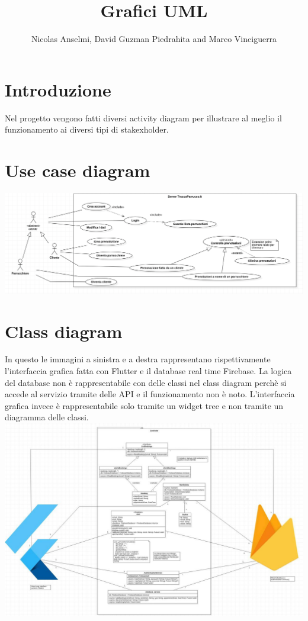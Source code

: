 \documentclass{article}
\title{Grafici UML}
\author{Nicolas Anselmi, David Guzman Piedrahita and Marco Vinciguerra}
\begin{document}
\maketitle        
\section{Introduzione}
Nel progetto vengono fatti diversi activity diagram per illustrare al
meglio il funzionamento ai diversi tipi di stakexholder.
 
\section{Use case diagram}
\includegraphics[scale = 0.45]{ImmaginiUML/UseCase.png}
\newpage
\section{Class diagram}
In questo le immagini a sinistra e a destra rappresentano rispettivamente l'interfaccia 
grafica fatta con Flutter e il database real time Firebase. La logica del database
non è rappresentabile con delle classi nel class diagram perchè si accede 
al servizio tramite delle API e il funzionamento non è noto.
L'interfaccia grafica invece è rappresentabile solo tramite un widget tree 
e non tramite un diagramma delle classi.
\\\includegraphics[scale = 0.4]{ImmaginiUML/ClassDiagram.jpg}
\newpage 
\end{document}
